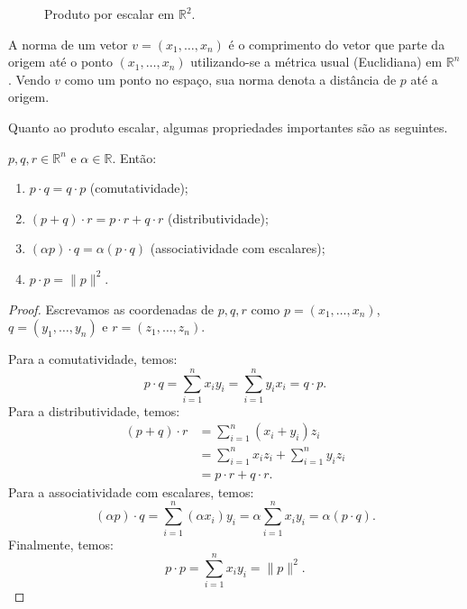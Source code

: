 \begin{figure}[ht]
    \centering
    \caption{Produto por escalar em $\mathbb R^2$.}
\end{figure}

A norma de um vetor $v=(x_1, \ldots, x_n)$ é o comprimento do vetor que parte da origem até o ponto $(x_1, \ldots, x_n)$ utilizando-se a métrica  usual (Euclidiana) em $\mathbb R^n$.
Vendo $v$ como um ponto no espaço, sua norma denota a distância de $p$ até a origem.

Quanto ao produto escalar, algumas propriedades importantes são as seguintes.

\begin{proposition}
    $p, q, r \in \mathbb R^n$ e $\alpha \in \mathbb R$. Então:
    \begin{enumerate}
        \item $p \cdot q = q \cdot p$ (comutatividade);
        \item $(p+q) \cdot r = p \cdot r + q \cdot r$ (distributividade);
        \item $(\alpha p) \cdot q = \alpha(p \cdot q)$ (associatividade com escalares);
        \item $p \cdot p = \|p\|^2$.
    \end{enumerate}
\end{proposition}

\begin{proof}
    Escrevamos as coordenadas de $p, q, r$ como $p=(x_1, \ldots, x_n)$, $q=(y_1, \ldots, y_n)$ e $r=(z_1, \ldots, z_n)$.

    Para a comutatividade, temos:
    \begin{equation*}
        p \cdot q = \sum_{i=1}^n x_iy_i = \sum_{i=1}^n y_ix_i = q \cdot p.
    \end{equation*}
    Para a distributividade, temos:
    \begin{align*}
        (p+q) \cdot r &= \sum_{i=1}^n (x_i+y_i)z_i \\
        &= \sum_{i=1}^n x_iz_i + \sum_{i=1}^n y_iz_i \\
        &= p \cdot r + q \cdot r.
    \end{align*}
    Para a associatividade com escalares, temos:
    \begin{equation*}
        (\alpha p) \cdot q = \sum_{i=1}^n (\alpha x_i)y_i = \alpha \sum_{i=1}^n x_iy_i = \alpha (p \cdot q).
    \end{equation*}
    Finalmente, temos:
    \begin{equation*}
        p \cdot p = \sum_{i=1}^n x_iy_i = \|p\|^2.
    \end{equation*}
\end{proof}

